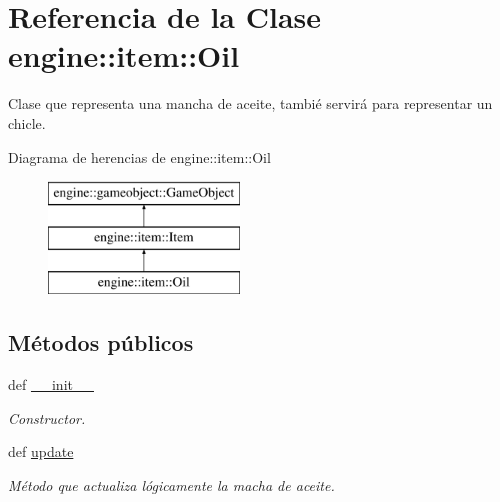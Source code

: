 \hypertarget{classengine_1_1item_1_1Oil}{
\section{\-Referencia de la \-Clase engine\-:\-:item\-:\-:\-Oil}
\label{classengine_1_1item_1_1Oil}
}


\-Clase que representa una mancha de aceite, tambié servirá para representar un chicle.  


\-Diagrama de herencias de engine\-:\-:item\-:\-:\-Oil\begin{figure}[H]
\begin{center}
\leavevmode
\includegraphics[height=3.000000cm]{classengine_1_1item_1_1Oil}
\end{center}
\end{figure}
\subsection*{\-Métodos públicos}
\begin{DoxyCompactItemize}
\item 
def \hyperlink{classengine_1_1item_1_1Oil_a0bcafb041f7f88c9f2f3d94d4c69523b}{\-\_\-\-\_\-init\-\_\-\-\_\-}
\begin{DoxyCompactList}\small\item\em \-Constructor. \end{DoxyCompactList}\item 
\hypertarget{classengine_1_1item_1_1Oil_af078f769d19f2b04566c164dac8d702d}{
def \hyperlink{classengine_1_1item_1_1Oil_af078f769d19f2b04566c164dac8d702d}{update}}
\label{classengine_1_1item_1_1Oil_af078f769d19f2b04566c164dac8d702d}

\begin{DoxyCompactList}\small\item\em \-Método que actualiza lógicamente la macha de aceite. \end{DoxyCompactList}\end{DoxyCompactItemize}
